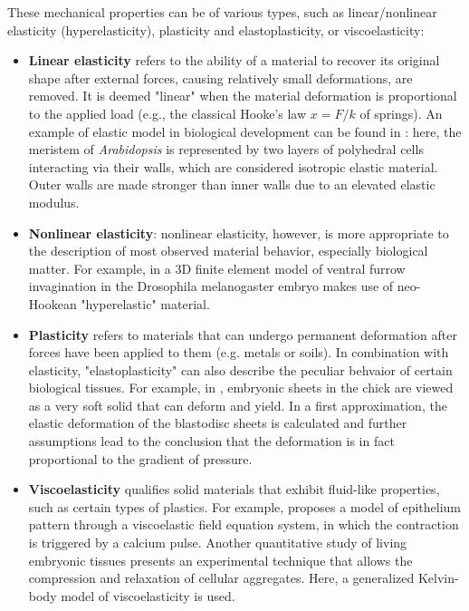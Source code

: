 These mechanical properties can be of various types, such as linear/nonlinear elasticity (hyperelasticity), plasticity and elastoplasticity, or viscoelasticity:
\begin{itemize}
	\item \textbf{Linear elasticity} refers to the ability of a material to recover its original shape after external forces, causing relatively small deformations, are removed. It is deemed "linear" when the material deformation is proportional to the applied load (e.g., the classical Hooke's law $x=F/k$ of springs). An example of elastic model in biological development can be found in \cite{Hamant:2008eb}: here, the meristem of \textit{Arabidopsis} is represented by two layers of polyhedral cells interacting via their walls, which are considered isotropic elastic material. Outer walls are made stronger than inner walls due to an elevated elastic modulus.
	\item \textbf{Nonlinear elasticity}: nonlinear elasticity, however, is more appropriate to the description of most observed material behavior, especially biological matter. For example, in \cite{Conte:2008cp} a 3D finite element model of ventral furrow invagination in the Drosophila melanogaster embryo makes use of neo-Hookean "hyperelastic" material.
	\item \textbf{Plasticity} refers to materials that can undergo permanent deformation after forces have been applied to them (e.g. metals or soils). In combination with elasticity, "elastoplasticity" can also describe the peculiar behvaior of certain biological tissues. For example, in \cite{Fleury:2005ul}, embryonic sheets in the chick are viewed as a very soft solid that can deform and yield. In a first approximation, the elastic deformation of the blastodisc sheets is calculated and further assumptions lead to the conclusion that the deformation is in fact proportional to the gradient of pressure.
	\item \textbf{Viscoelasticity} qualifies solid materials that exhibit fluid-like properties, such as certain types of plastics. For example, \cite{Murray:1984tp} proposes a model of epithelium pattern through a viscoelastic field equation system, in which the contraction is triggered by a calcium pulse. Another quantitative study of living embryonic tissues \cite{Forgacs:1998ux} presents an experimental technique that allows the compression and relaxation of cellular aggregates. Here, a generalized Kelvin-body model of viscoelasticity is used.
\end{itemize}

